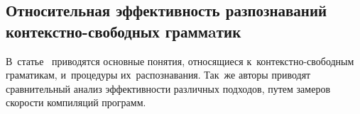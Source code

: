 \subsection{Относительная эффективность разпознаваний контекстно-свободных граммaтик} \label{subsection_Griffiths1965}
В~статье~\cite{Griffiths1965} приводятся основные понятия, относящиеся к~контекстно-свободным граматикам, и~процедуры их~распознавания. Так~же авторы приводят сравнительный анализ эффективности различных подходов, путем замеров скорости компиляций программ. 

